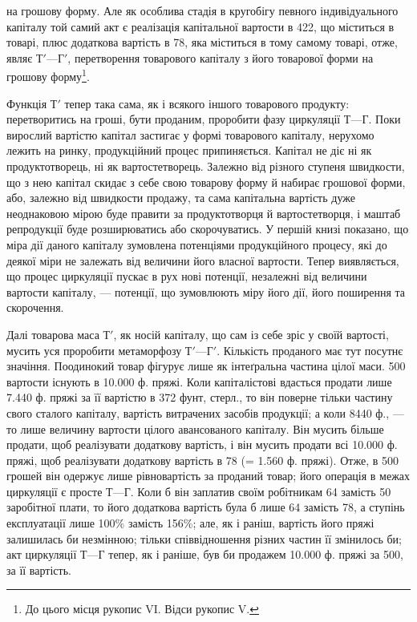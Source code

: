 \parcont{}  %
на грошову форму. Але як особлива стадія в кругобігу певного індивідуального
капіталу той самий акт є реалізація капітальної вартости
в 422, що міститься в товарі, плюс додаткова вартість в 78, яка міститься в тому самому товарі, отже, являє $Т' — Г'$, перетворення
товарового капіталу з його товарової форми на грошову форму\footnote{
До цього місця рукопис VI. Відси рукопис V.
}.

Функція $Т'$ тепер така сама, як і всякого іншого товарового продукту:
перетворитись на гроші, бути проданим, проробити фазу циркуляції
$Т — Г$. Поки вирослий вартістю капітал застигає у формі товарового
капіталу, нерухомо лежить на ринку, продукційний процес припиняється.
Капітал не діє ні як продуктотворець, ні як вартостетворець. Залежно від
різного ступеня швидкости, що з нею капітал скидає з себе свою товарову
форму й набирає грошової форми, або, залежно від швидкости продажу,
та сама капітальна вартість дуже неоднаковою мірою буде правити за
продуктотворця й вартостетворця, і маштаб репродукції буде розширюватись
або скорочуватись. У першій книзі показано, що міра дії даного
капіталу зумовлена потенціями продукційного процесу, які до деякої
міри не залежать від величини його власної вартости. Тепер виявляється,
що процес циркуляції пускає в рух нові потенції, незалежні від величини
вартости капіталу, — потенції, що зумовлюють міру його дії, його поширення
та скорочення.

Далі товарова маса $Т'$, як носій капіталу, що сам із себе зріс у своїй
вартості, мусить уся проробити метаморфозу $Т' — Г'$. Кількість проданого
має тут посутнє значіння. Поодинокий товар фігурує лише як інтеґральна
частина цілої маси. 500 вартости існують в \num{10.000} ф. пряжі.
Коли капіталістові вдасться продати лише \num{7.440} ф. пряжі за її вартістю
в 372 фунт, стерл., то він поверне тільки частину свого сталого капіталу,
вартість витрачених засобів продукції; а коли 8440 ф., — то лише величину
вартости цілого авансованого капіталу. Він мусить більше продати, щоб
реалізувати додаткову вартість, і він мусить продати всі \num{10.000} ф.
пряжі, щоб реалізувати додаткову вартість в 78 (= \num{1.560} ф.
пряжі). Отже, в 500 грошей він одержує лише рівновартість
за проданий товар; його операція в межах циркуляції є просте $Т — Г$.
Коли б він заплатив своїм робітникам 64 замість 50
заробітної плати, то його додаткова вартість була б лише 64
замість 78, а ступінь експлуатації лише 100\% замість
156\%; але, як і раніш, вартість його пряжі залишилась би незмінною;
тільки співвідношення різних частин її змінилось би; акт циркуляції $Т — Г$
тепер, як і раніше, був би продажем \num{10.000} ф. пряжі за 500,
за її вартість.

